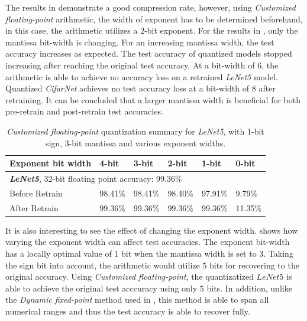 \documentclass[a4paper,12pt]{report}
\begin{document}
The results in  demonstrate a good compression rate, however,
using \textit{Customized floating-point} arithmetic, the width of exponent has
to be determined beforehand, in this case, the arithmetic utilizes a $2$-bit
exponent.
For the results in , only the mantissa bit-width is
changing.
For an increasing mantissa width, the test accuracy increases as expected.
The test accuracy of quantized models stopped increasing after reaching the original test accuracy.
At a bit-width of $6$, the arithmetic is able to achieve no accuracy loss
on a retrained \textit{LeNet5} model.
Quantized \textit{CifarNet} achieves no test accuracy loss at a bit-width of
$8$ after retraining.
It can be concluded that a larger mantissa width is beneficial for both pre-retrain
and post-retrain test accuracies.
\begin{table}[!h]
  \centering
  \begin{tabular}{llllll}
    \hline
    \hline
    Exponent bit width               &4-bit     &3-bit     &2-bit     &1-bit      &0-bit    \\
    \hline
    \multicolumn{5}{l}{\textbf{\textit{LeNet5}}, 32-bit floating point accuracy: 99.36\%}\\
    \hline
    \hline
    Before Retrain          &98.41\%    &98.41\%    &98.40\%  &97.91\%      &9.79\%\\
    After Retrain           &99.36\%    &99.36\%    &99.36\%  &99.36\%     &11.35\%\\
    \hline
    \hline
  \end{tabular}
  \caption{\textit{Customized floating-point} quantization summary for
  \textit{LeNet5}, with 1-bit sign, 3-bit mantissa and various exponent widths.}
  \label{tab:cfp_exp_sum}
\end{table}

It is also interesting to see the effect of changing the exponent width.
 shows how varying the exponent width can affect test
accuracies.
The exponent bit-width has a locally optimal value of $1$ bit when the
mantissa width is set to $3$.
Taking the sign bit into account, the arithmetic would utilize $5$ bits for
recovering to the original accuracy.
Using \textit{Customized floating-point}, the quantizatized $LeNet5$ is able to
achieve the original test acccuracy using only $5$ bits.
In addition, unlike the \textit{Dynamic fixed-point} method used in ,
this method is able to span all numerical ranges and thus the test accuracy is
able to recover fully.
\end{document}
